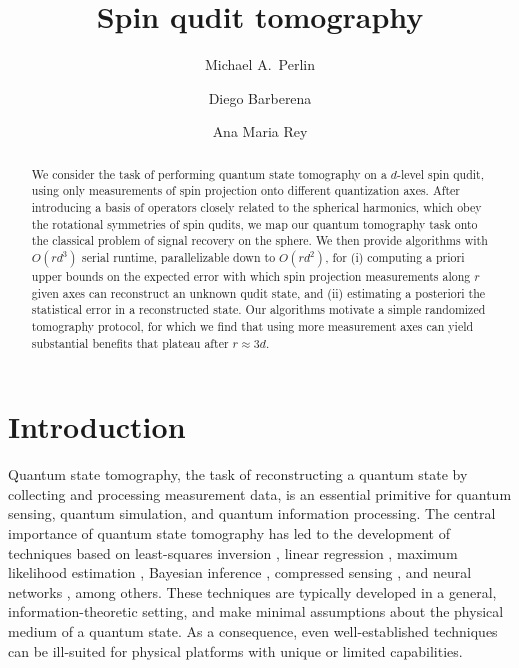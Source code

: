 \documentclass[nofootinbib,twocolumn]{revtex4-1}
\newcommand{\p}[1]{\left(#1\right)} %
\begin{document}
\title{Spin qudit tomography}
\author{Michael A.~Perlin}
\author{Diego Barberena}
\author{Ana Maria Rey}


\begin{abstract}
We consider the task of performing quantum state tomography on a $d$-level spin qudit, using only measurements of spin projection onto different quantization axes.
After introducing a basis of operators closely related to the spherical harmonics, which obey the rotational symmetries of spin qudits, we map our quantum tomography task onto the classical problem of signal recovery on the sphere.
We then provide algorithms with $O\p{rd^3}$ serial runtime, parallelizable down to $O\p{rd^2}$, for (i) computing a priori upper bounds on the expected error with which spin projection measurements along $r$ given axes can reconstruct an unknown qudit state, and (ii) estimating a posteriori the statistical error in a reconstructed state.
Our algorithms motivate a simple randomized tomography protocol, for which we find that using more measurement axes can yield substantial benefits that plateau after $r\approx3d$.
\end{abstract}

\maketitle

\section{Introduction}

Quantum state tomography, the task of reconstructing a quantum state by collecting and processing measurement data, is an essential primitive for quantum sensing, quantum simulation, and quantum information processing.
The central importance of quantum state tomography has led to the development of techniques based on least-squares inversion \cite{opatrny1997leastsquares}, linear regression \cite{qi2013quantum}, maximum likelihood estimation \cite{teo2011quantumstate, smolin2012efficient}, Bayesian inference \cite{huszar2012adaptive, ferrie2014quantum, granade2016practical}, compressed sensing \cite{gross2010quantum, kalev2015quantum}, and neural networks \cite{torlai2018neuralnetwork}, among others.
These techniques are typically developed in a general, information-theoretic setting, and make minimal assumptions about the physical medium of a quantum state.
As a consequence, even well-established techniques can be ill-suited for physical platforms with unique or limited capabilities.
\end{document}

